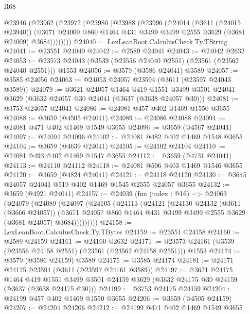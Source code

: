 \begin{lexlean}{R68}
\begin{coremodule}
    @23946
      (@23962
        (@23972
          (@23980
            (@23988
              (@23996
                (@24014
                  (@3611 (@24015 @23940))
                  (@3671 @24009 @860 @1464 @431 @3499 @3499 @2555 @3629 (@3681 @24009) @3684))))))))
@24040 := LexLeanBoot.CalculusCheck.Ty.TString
@24041 := @23551 @24040
@24042 := @2589 @24041
@24043 := @24042 @2632
@24053 := @23573 @24043 (@3539 (@23556 @24040 @2551) (@23561 (@23562 @24040 @2551))) @1553
@24056 := @3579 (@3586 @24041) @3589
@24057 := @3585 @24056
@24063 := @24053 @24057 @23594 (@3611 (@23597 @24043 @3589))
@24079 := @3621
    @24057
    @1464
    @419
    @1551
    @3499
    @3501
    @24041
    @3629
    (@3632 @24057 @30 @24041 (@3637 (@3638 @24057 @30)))
@24081 := @3753 @24057 @24041
@24086 := @24081 @457 @402 @1469 @1550 @3655
@24088 := @3659 (@4505 @24041)
@24089 := @24086 @24088
@24094 := @24081 @471 @402 @1469 @1549 @3655
@24096 := @3659 (@4567 @24041)
@24097 := @24094 @24096
@24102 := @24081 @482 @402 @1469 @1548 @3655
@24104 := @3659 (@4639 @24041)
@24105 := @24102 @24104
@24110 := @24081 @493 @402 @1469 @1547 @3655
@24112 := @3659 (@4731 @24041)
@24113 := @24110 @24112
@24118 := @24081 @506 @403 @1469 @1546 @3655
@24120 := @3659 (@4824 @24041)
@24121 := @24118 @24120
@24130 := @3645 @24057 @24041 @519 @402 @1469 @1545 @2555 @24057 @3655
@24132 := @3659 (@4921 @24041)
@24157 := @24039
    (fun (index : @16) =>
    @24063
      (@24079
        (@24089
          (@24097
            (@24105
              (@24113
                (@24121
                  (@24130
                    @24132
                    (@3611 (@3666 @24057))
                    (@3671
                      @24057
                      @860
                      @1464
                      @431
                      @3499
                      @3499
                      @2555
                      @3629
                      (@3681 @24057)
                      @3684)))))))))
@24158 := LexLeanBoot.CalculusCheck.Ty.TBytes
@24159 := @23551 @24158
@24160 := @2589 @24159
@24161 := @24160 @2632
@24171 := @23573 @24161 (@3539 (@23556 @24158 @2551) (@23561 (@23562 @24158 @2551))) @1553
@24174 := @3579 (@3586 @24159) @3589
@24175 := @3585 @24174
@24181 := @24171 @24175 @23594 (@3611 (@23597 @24161 @3589))
@24197 := @3621
    @24175
    @1464
    @419
    @1551
    @3499
    @3501
    @24159
    @3629
    (@3632 @24175 @30 @24159 (@3637 (@3638 @24175 @30)))
@24199 := @3753 @24175 @24159
@24204 := @24199 @457 @402 @1469 @1550 @3655
@24206 := @3659 (@4505 @24159)
@24207 := @24204 @24206
@24212 := @24199 @471 @402 @1469 @1549 @3655

\end{coremodule}
\end{lexlean}
